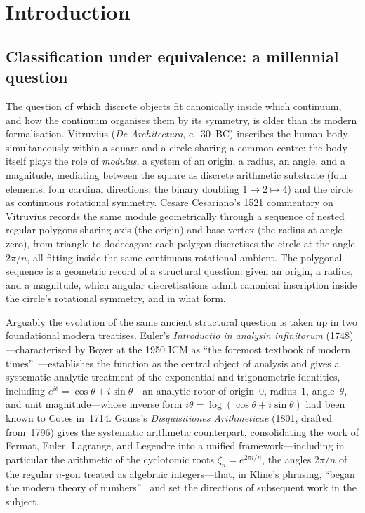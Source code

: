 \section{Introduction}

\subsection{Classification under equivalence: a millennial question}
\label{ssec:classification}

The question of which discrete objects fit canonically inside which
continuum, and how the continuum organises them by its symmetry, is
older than its modern formalisation.  Vitruvius (\emph{De
Architectura}, c.~30~BC) inscribes the human body simultaneously
within a square and a circle sharing a common centre: the body itself
plays the role of \emph{modulus}, a system of an origin, a radius, an
angle, and a magnitude, mediating between the square as discrete
arithmetic substrate (four elements, four cardinal directions, the
binary doubling $1\mapsto 2\mapsto 4$) and the circle as continuous
rotational symmetry.  Cesare Cesariano's 1521 commentary on Vitruvius
records the same module geometrically through a sequence of nested
regular polygons sharing axis (the origin) and base vertex (the
radius at angle zero), from triangle to dodecagon: each polygon
discretises the circle at the angle $2\pi/n$, all fitting inside the
same continuous rotational ambient.  The polygonal sequence is a
geometric record of a structural question: given an origin, a radius,
and a magnitude, which angular discretisations admit canonical
inscription inside the circle's rotational symmetry, and in what form.

Arguably the evolution of the same ancient structural question is
taken up in two foundational modern treatises.  Euler's
\emph{Introductio in analysin infinitorum} (1748)---characterised by
Boyer at the 1950 ICM as ``the foremost textbook of modern
times''~\cite{boyer-1951}---establishes the function as the central
object of analysis and gives a systematic analytic treatment of the
exponential and trigonometric identities, including
$e^{i\theta}=\cos\theta+i\sin\theta$---an analytic rotor of origin~$0$,
radius~$1$, angle~$\theta$, and unit magnitude---whose inverse form
$i\theta=\log(\cos\theta+i\sin\theta)$ had been known to Cotes
in~1714.  Gauss's \emph{Disquisitiones Arithmeticae} (1801, drafted
from~1796) gives the systematic arithmetic counterpart, consolidating
the work of Fermat, Euler, Lagrange, and Legendre into a unified
framework---including in particular the arithmetic of the cyclotomic
roots $\zeta_{n}=e^{2\pi i/n}$, the angles $2\pi/n$ of the regular
$n$-gon treated as algebraic integers---that, in Kline's phrasing,
``began the modern theory of numbers''~\cite{kline-1972} and set the
directions of subsequent work in the subject.

